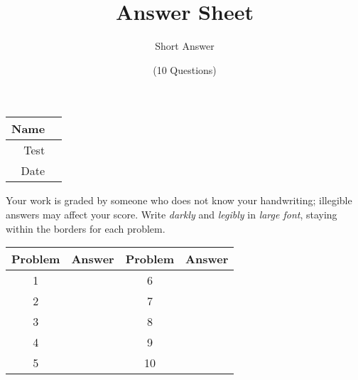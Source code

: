 \documentclass[a4paper, 12pt]{article}
\title{Answer Sheet}
\author{Short Answer}
\date{(10 Questions)}
\begin{document}
\maketitle

\begin{center}
\begin{tabular}{|r|r|}
\hline
	\hspace{3em} Name & \hspace{30em} \\\hline
	Test & \qquad \\ \hline
	Date & \qquad \\ \hline
\end{tabular}
\end{center}

Your work is graded by someone who does not know your handwriting; illegible answers may affect your score. Write \emph{darkly} and \emph{legibly} in \emph{large font}, staying within the borders for each problem.

\begin{center}
\begin{tabularx}{\textwidth}{|c|l|c|X|}\hline
	Problem & Answer & Problem & Answer \\\hline
	1 & \hspace{13.45em} & 6 & \\\hline
	2 & & 7 & \\\hline
	3 & & 8 & \\\hline
	4 & & 9 & \\\hline
	5 & & 10 & \\\hline
\end{tabularx}
\end{center}
\end{document}
